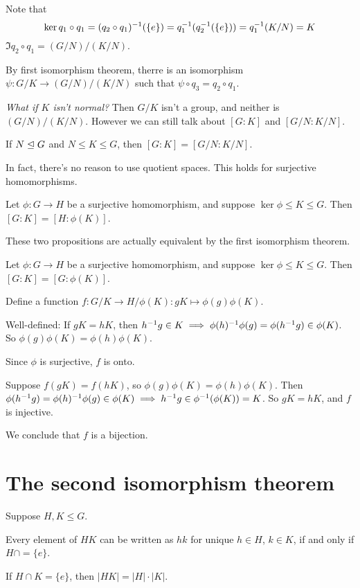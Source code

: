 \begin{pf}
Note that 
$$
\ker q_1\circ q_1 = (q_2\circ q_1)^{-1} (\{e\}) = q_1^{-1} (q_2^{-1} (\{e\}))= q_1^{-1} (K/N)=K
$$
$\Im q_2\circ q_1 = (G/N)/(K/N)$. 

By first isomorphism theorem, therre is an isomorphism $\psi:G/K\to (G/N)/(K/N)$ such that $\psi\circ q_3=q_2\circ q_1$.
\end{pf}

\textit{What if $K$ isn't normal?} Then $G/K$ isn't a group, and neither is $(G/N)/(K/N)$. However we can still talk about $[G:K]$ and $[G/N:K/N]$.

\begin{prop}
If $N\trianglelefteq G$ and $N\le K \le G$, then $[G:K]=[G/N:K/N]$.
\end{prop}

In fact, there's no reason to use quotient spaces. This holds for surjective homomorphisms.

\begin{prop}
Let $\phi:G\to H$ be a surjective homomorphism, and suppose $\ker\phi\le K\le G$. Then $[G:K]=[H:\phi(K)]$.
\end{prop}

These two propositions are actually equivalent by the first isomorphism theorem. 

\begin{prop}
Let $\phi:G\to H$ be a surjective homomorphism, and suppose $\ker\phi\le K\le G$. Then $[G:K]=[G:\phi(K)]$.
\end{prop}

\begin{pf}
Define a function $f:G/K\to H/\phi(K):gK \mapsto \phi(g)\phi(K)$.

Well-defined: If $gK=hK$, then $h^{-1} g\in K \implies \phi(h)^{-1} \phi(g)=\phi(h^{-1} g)\in \phi(K)$. So $\phi(g)\phi(K)=\phi(h)\phi(K)$.

Since $\phi$ is surjective, $f$ is onto.

Suppose $f(gK)=f(hK)$, so $\phi(g)\phi(K)=\phi(h)\phi(K)$. Then $\phi(h^{-1} g) = \phi(h)^{-1} \phi(g)\in \phi(K)\implies h^{-1} g \in \phi^{-1}(\phi(K))=K$. So $gK=hK$, and $f$ is injective.

We conclude that $f$ is a bijection.
\end{pf}

\section{The second isomorphism theorem}
Suppose $H,K\le G$.
\begin{lemma}
Every element of $HK$ can be written as $hk$ for unique $h\in H$, $k\in K$, if and only if $H\cap = \{e\}$.
\end{lemma}
If $H\cap K=\{e\}$, then $|HK|=|H|\cdot |K|$.


